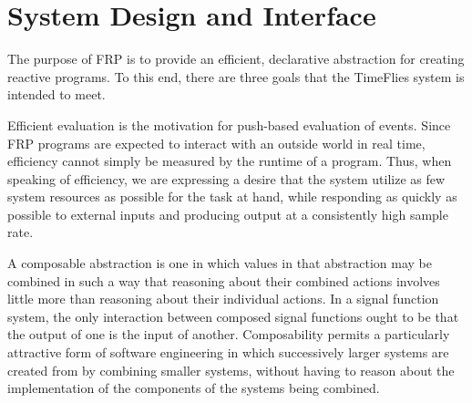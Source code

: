 \section{System Design and Interface}
\label{section:System_Design_and_Interface}

The purpose of FRP is to provide an efficient, declarative abstraction for creating
reactive programs. To this end, there are three goals that the TimeFlies
system is intended to meet. 

Efficient evaluation is the motivation for push-based evaluation of events.
Since FRP programs are expected to  interact with an outside world in real time,
efficiency cannot simply be measured by the runtime of a program. Thus, when speaking of efficiency,
we are expressing a desire that the system utilize as few system resources as possible
for the task at hand, while responding as quickly as possible to external inputs and
producing output at a consistently high sample rate.


A composable abstraction is one in which values in that abstraction may be
combined in such a way that reasoning about their combined actions involves
little more than reasoning about their individual actions. In a signal function
system, the only interaction between composed signal functions ought to be that
the output of one is the input of another. Composability permits a particularly
attractive form of software engineering in which successively larger systems are
created from by combining smaller systems, without having to reason about the 
implementation of the components of the systems being combined.


